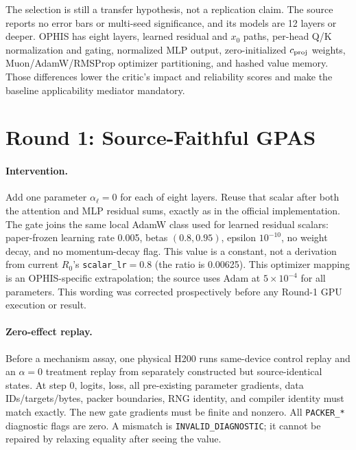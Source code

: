 \documentclass{article}
\begin{document}
The selection is still a transfer hypothesis, not a replication claim.
The source reports no error bars or multi-seed significance, and its models
are 12 layers or deeper.  OPHIS has eight layers, learned residual and $x_0$
paths, per-head Q/K normalization and gating, normalized MLP output,
zero-initialized $c_{\rm proj}$ weights, Muon/AdamW/RMSProp optimizer
partitioning, and hashed value memory.  Those differences lower the critic's
impact and reliability scores and make the baseline applicability mediator
mandatory.

\section{Round 1: Source-Faithful GPAS}

\paragraph{Intervention.}
Add one parameter $\alpha_\ell=0$ for each of eight layers.  Reuse that
scalar after both the attention and MLP residual sums, exactly as in the
official implementation.  The gate joins the same local AdamW class used for
learned residual scalars: paper-frozen learning rate 0.005, betas
$(0.8,0.95)$, epsilon $10^{-10}$, no weight decay, and no momentum-decay
flag.  This value is a constant, not a derivation from current $R_0$'s
\texttt{scalar\_lr}$=0.8$ (the ratio is 0.00625).  This optimizer mapping is
an OPHIS-specific extrapolation; the source uses Adam at $5\times10^{-4}$ for
all parameters.  This wording was corrected prospectively before any
Round-1 GPU execution or result.

\paragraph{Zero-effect replay.}
Before a mechanism assay, one physical H200 runs same-device control replay
and an $\alpha=0$ treatment replay from separately constructed but
source-identical states.  At step 0, logits, loss, all pre-existing parameter
gradients, data IDs/targets/bytes, packer boundaries, RNG identity, and
compiler identity must match exactly.  The new gate gradients must be finite
and nonzero.  All \texttt{PACKER\_*} diagnostic flags are zero.  A mismatch is
\texttt{INVALID\_DIAGNOSTIC}; it cannot be repaired by relaxing equality
after seeing the value.
\end{document}
